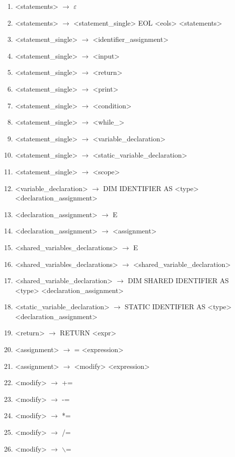 \begin{normalsize}
\begin{enumerate}
\item <statements> $\rightarrow$ $\varepsilon$
\item <statements> $\rightarrow$ <statement\_single> EOL <eols> <statements>


\item <statement\_single> $\rightarrow$ <identifier\_assignment>
\item <statement\_single> $\rightarrow$ <input>
\item <statement\_single> $\rightarrow$ <return>
\item <statement\_single> $\rightarrow$ <print>
\item <statement\_single> $\rightarrow$ <condition>
\item <statement\_single> $\rightarrow$ <while\_>
\item <statement\_single> $\rightarrow$ <variable\_declaration>
\item <statement\_single> $\rightarrow$ <static\_variable\_declaration>
\item <statement\_single> $\rightarrow$ <scope>

\item <variable\_declaration> $\rightarrow$ DIM IDENTIFIER AS <type> <declaration\_assignment>
\item <declaration\_assignment> $\rightarrow$ E
\item <declaration\_assignment> $\rightarrow$ <assignment>

\item <shared\_variables\_declarations> $\rightarrow$ E
\item <shared\_variables\_declarations> $\rightarrow$ <shared\_variable\_declaration>
\item <shared\_variable\_declaration> $\rightarrow$ DIM SHARED IDENTIFIER AS <type> <declaration\_assignment>

\item <static\_variable\_declaration> $\rightarrow$ STATIC IDENTIFIER AS <type> <declaration\_assignment>

\item <return> $\rightarrow$ RETURN <expr>

\item <assignment> $\rightarrow$ = <expression>
\item <assignment> $\rightarrow$ <modify> <expression>
\item <modify> $\rightarrow$ +=
\item <modify> $\rightarrow$ -=
\item <modify> $\rightarrow$ *=
\item <modify> $\rightarrow$ /=
\item <modify> $\rightarrow$ $\backslash$=


\end{enumerate}
\end{normalsize}
